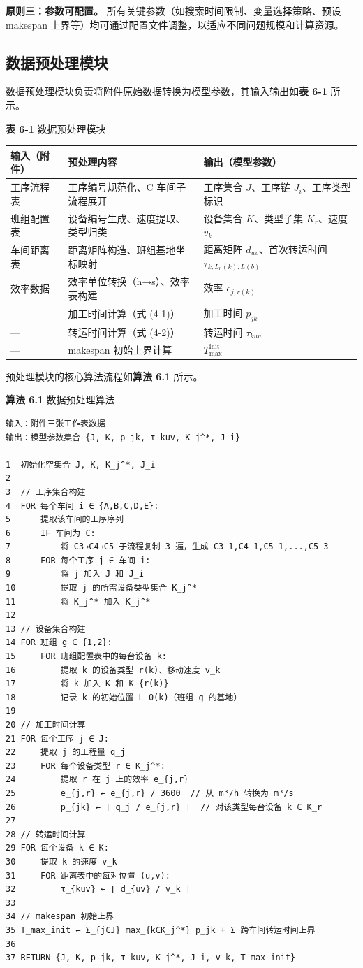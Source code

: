 \documentclass[UTF8,a4paper,12pt]{ctexart}
\begin{document}
\textbf{原则三：参数可配置。} 所有关键参数（如搜索时间限制、变量选择策略、预设 makespan 上界等）均可通过配置文件调整，以适应不同问题规模和计算资源。

\subsection{数据预处理模块}
数据预处理模块负责将附件原始数据转换为模型参数，其输入输出如\textbf{表 6-1} 所示。

\begin{center}
\textbf{表 6-1} 数据预处理模块
\begin{tabular}{lll}
\toprule
输入（附件） & 预处理内容 & 输出（模型参数） \\
\midrule
工序流程表 & 工序编号规范化、C 车间子流程展开 & 工序集合 $J$、工序链 $J_i$、工序类型标识 \\
班组配置表 & 设备编号生成、速度提取、类型归类 & 设备集合 $K$、类型子集 $K_r$、速度 $v_k$ \\
车间距离表 & 距离矩阵构造、班组基地坐标映射 & 距离矩阵 $d_{uv}$、首次转运时间 $\tau_{k,L_0(k),L(b)}$ \\
效率数据 & 效率单位转换（h→s）、效率表构建 & 效率 $e_{j,r(k)}$ \\
— & 加工时间计算（式 (4-1)） & 加工时间 $p_{jk}$ \\
— & 转运时间计算（式 (4-2)） & 转运时间 $\tau_{kuv}$ \\
— & makespan 初始上界计算 & $T_{\max}^{\text{init}}$ \\
\bottomrule
\end{tabular}
\end{center}

预处理模块的核心算法流程如\textbf{算法 6.1} 所示。

\textbf{算法 6.1} 数据预处理算法
\begin{verbatim}
输入：附件三张工作表数据
输出：模型参数集合 {J, K, p_jk, τ_kuv, K_j^*, J_i}

1  初始化空集合 J, K, K_j^*, J_i
2
3  // 工序集合构建
4  FOR 每个车间 i ∈ {A,B,C,D,E}:
5      提取该车间的工序序列
6      IF 车间为 C:
7          将 C3→C4→C5 子流程复制 3 遍，生成 C3_1,C4_1,C5_1,...,C5_3
8      FOR 每个工序 j ∈ 车间 i:
9          将 j 加入 J 和 J_i
10         提取 j 的所需设备类型集合 K_j^*
11         将 K_j^* 加入 K_j^*
12 
13 // 设备集合构建
14 FOR 班组 g ∈ {1,2}:
15     FOR 班组配置表中的每台设备 k:
16         提取 k 的设备类型 r(k)、移动速度 v_k
17         将 k 加入 K 和 K_{r(k)}
18         记录 k 的初始位置 L_0(k)（班组 g 的基地）
19 
20 // 加工时间计算
21 FOR 每个工序 j ∈ J:
22     提取 j 的工程量 q_j
23     FOR 每个设备类型 r ∈ K_j^*:
24         提取 r 在 j 上的效率 e_{j,r}
25         e_{j,r} ← e_{j,r} / 3600  // 从 m³/h 转换为 m³/s
26         p_{jk} ← ⌈ q_j / e_{j,r} ⌉  // 对该类型每台设备 k ∈ K_r
27 
28 // 转运时间计算
29 FOR 每个设备 k ∈ K:
30     提取 k 的速度 v_k
31     FOR 距离表中的每对位置 (u,v):
32         τ_{kuv} ← ⌈ d_{uv} / v_k ⌉
33 
34 // makespan 初始上界
35 T_max_init ← Σ_{j∈J} max_{k∈K_j^*} p_jk + Σ 跨车间转运时间上界
36 
37 RETURN {J, K, p_jk, τ_kuv, K_j^*, J_i, v_k, T_max_init}
\end{verbatim}
\end{document}
